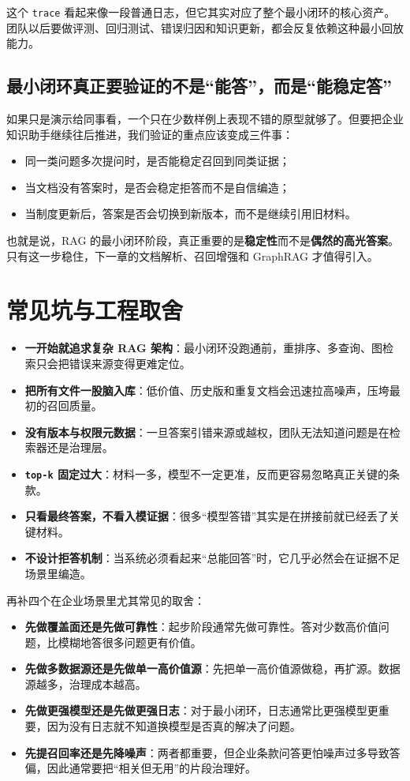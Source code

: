 这个 \texttt{trace} 看起来像一段普通日志，但它其实对应了整个最小闭环的核心资产。团队以后要做评测、回归测试、错误归因和知识更新，都会反复依赖这种最小回放能力。

\subsection{最小闭环真正要验证的不是“能答”，而是“能稳定答”}
如果只是演示给同事看，一个只在少数样例上表现不错的原型就够了。但要把企业知识助手继续往后推进，我们验证的重点应该变成三件事：
\begin{itemize}
  \item 同一类问题多次提问时，是否能稳定召回到同类证据；
  \item 当文档没有答案时，是否会稳定拒答而不是自信编造；
  \item 当制度更新后，答案是否会切换到新版本，而不是继续引用旧材料。
\end{itemize}

也就是说，RAG 的最小闭环阶段，真正重要的是\textbf{稳定性}而不是\textbf{偶然的高光答案}。只有这一步稳住，下一章的文档解析、召回增强和 GraphRAG 才值得引入。

\section{常见坑与工程取舍}
\begin{itemize}
  \item \textbf{一开始就追求复杂 RAG 架构}：最小闭环没跑通前，重排序、多查询、图检索只会把错误来源变得更难定位。
  \item \textbf{把所有文件一股脑入库}：低价值、历史版和重复文档会迅速拉高噪声，压垮最初的召回质量。
  \item \textbf{没有版本与权限元数据}：一旦答案引错来源或越权，团队无法知道问题是在检索器还是治理层。
  \item \textbf{\texttt{top-k} 固定过大}：材料一多，模型不一定更准，反而更容易忽略真正关键的条款。
  \item \textbf{只看最终答案，不看入模证据}：很多“模型答错”其实是在拼接前就已经丢了关键材料。
  \item \textbf{不设计拒答机制}：当系统必须看起来“总能回答”时，它几乎必然会在证据不足场景里编造。
\end{itemize}

再补四个在企业场景里尤其常见的取舍：
\begin{itemize}
  \item \textbf{先做覆盖面还是先做可靠性}：起步阶段通常先做可靠性。答对少数高价值问题，比模糊地答很多问题更有价值。
  \item \textbf{先做多数据源还是先做单一高价值源}：先把单一高价值源做稳，再扩源。数据源越多，治理成本越高。
  \item \textbf{先做更强模型还是先做更强日志}：对于最小闭环，日志通常比更强模型更重要，因为没有日志就不知道换模型是否真的解决了问题。
  \item \textbf{先提召回率还是先降噪声}：两者都重要，但企业条款问答更怕噪声过多导致答偏，因此通常要把“相关但无用”的片段治理好。
\end{itemize}

